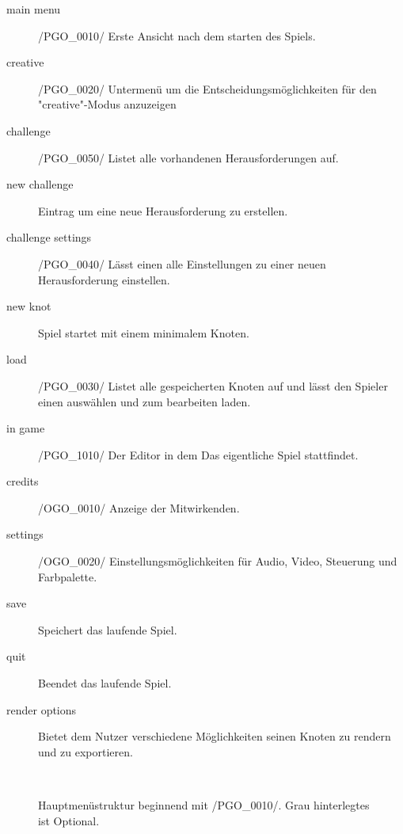 	\begin{description}
		\item[main menu] /PGO\_0010/ Erste Ansicht nach dem starten des Spiels.
		\item[creative] /PGO\_0020/ Untermenü um die Entscheidungsmöglichkeiten für den "creative"-Modus anzuzeigen
		\item[challenge] /PGO\_0050/ Listet alle vorhandenen Herausforderungen auf.
		\item[new challenge] Eintrag um eine neue Herausforderung zu erstellen.
		\item[challenge settings] /PGO\_0040/ Lässt einen alle Einstellungen zu einer neuen Herausforderung einstellen.
		\item[new knot] Spiel startet mit einem minimalem Knoten.
		\item[load] /PGO\_0030/ Listet alle gespeicherten Knoten auf und lässt den Spieler einen auswählen und zum bearbeiten laden.
		\item[in game] /PGO\_1010/ Der Editor in dem Das eigentliche Spiel stattfindet.
		\item[credits] /OGO\_0010/ Anzeige der Mitwirkenden.
		\item[settings] /OGO\_0020/ Einstellungsmöglichkeiten für Audio, Video, Steuerung und Farbpalette.
		\item[save] Speichert das laufende Spiel.
		\item[quit] Beendet das laufende Spiel.
		\item[render options] Bietet dem Nutzer verschiedene Möglichkeiten seinen Knoten zu rendern und zu exportieren.
	\end{description}
   
   ~\\
    
	\begin{figure}[h]
		\centering
	 	
	 	\caption{Hauptmenüstruktur beginnend mit /PGO\_0010/. Grau hinterlegtes ist Optional.}
	\end{figure}
	
	
